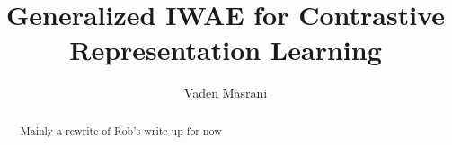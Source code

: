 

\title{Generalized IWAE for Contrastive Representation Learning}
\author{Vaden Masrani}



\maketitle
\begin{abstract}
    Mainly a rewrite of Rob's write up for now
\end{abstract}





\clearpage
\appendix


